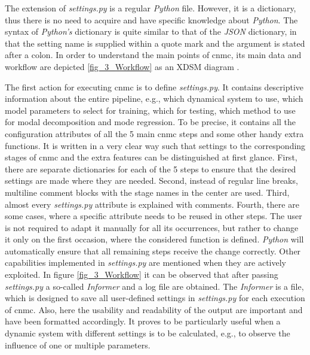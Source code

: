  The extension of \emph{settings.py} is a regular \emph{Python} file. However, it is a dictionary, thus there is no need to acquire and have specific knowledge about \emph{Python}. 
 The syntax of \emph{Python's} dictionary is quite similar to that of the \emph{JSON} dictionary, in that the setting name is supplied within a quote mark 
 and the argument is stated after a colon. In order to understand the main points of \gls{cnmc}, its main data and workflow are depicted \ref{fig_3_Workflow} as an XDSM diagram \cite{Lambe2012}. 
  \newline 
 
 \begin{sidewaysfigure} [!]
    \hspace*{-2cm} 
     \resizebox{\textwidth}{!}{
     
     }
     \caption{\gls{cnmc} general workflow overview}
     \label{fig_3_Workflow}
 \end{sidewaysfigure}

The first action for executing \gls{cnmc} is to define \emph{settings.py}. It contains descriptive information about the entire pipeline, e.g., which dynamical system to use, which model parameters to select for training, which for testing, which method to use for modal decomposition and mode regression. 
To be precise, it contains all the configuration attributes of all the 5 main \gls{cnmc} steps and some other handy extra functions. It is written in 
a very clear way such that settings to the corresponding stages of \gls{cnmc} 
and the extra features can be distinguished at first glance.
First, there are separate dictionaries for each of the 5 steps to ensure that the desired settings are made where they are needed. 
Second, instead of regular line breaks, multiline comment blocks with the stage names in the center are used. 
Third, almost every \emph{settings.py} attribute is explained with comments. 
Fourth, there are some cases, where 
a specific attribute needs to be reused in other steps. 
The user is not required to adapt it manually for all its occurrences, but rather to change it only on the first occasion, where the considered function is defined. 
\emph{Python} will automatically ensure that all remaining steps receive the change correctly. 
Other capabilities implemented in \emph{settings.py} are mentioned when they are actively exploited.
In figure \ref{fig_3_Workflow} it can be observed that after passing \emph{settings.py} a so-called \emph{Informer} and a log file are obtained. 
The \emph{Informer} is a file, which is designed to save all user-defined settings in \emph{settings.py} for each execution of \gls{cnmc}.
Also, here the usability and readability of the output are important and have been formatted accordingly. It proves to be particularly useful when a dynamic system with different settings is to be calculated, e.g., to observe the influence of one or multiple parameters. \newline 


